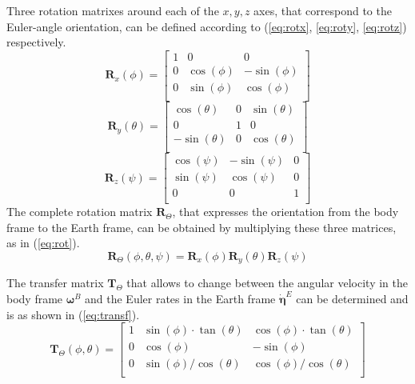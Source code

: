 \documentclass[journal, twoside]{IEEEtran}
\begin{document}
	Three rotation matrixes around each of the $x, y, z$ axes, that correspond to the Euler-angle orientation, can be defined according to (\ref{eq:rotx}, \ref{eq:roty}, \ref{eq:rotz}) respectively.
	\begin{equation} \label{eq:rotx}
	\bm{R}_x (\phi)=
	\left[ {\begin{array}{ccc}
		1 & 0 & 0 \\
		0 & \cos(\phi) & -\sin(\phi) \\
		0 &  \sin(\phi) & \cos(\phi) \\ 
		\end{array} } \right]
	\end{equation}  
	\begin{equation} \label{eq:roty}
	\bm{R}_y (\theta)=
	\left[ {\begin{array}{ccc}
		\cos(\theta) & 0 & \sin(\theta) \\
		0 & 1 & 0 \\
		-\sin(\theta) &  0 & \cos(\theta) \\ 
		\end{array} } \right]
	\end{equation}  
	\begin{equation} \label{eq:rotz}
	\bm{R}_z (\psi)=
	\left[ {\begin{array}{ccc}
		\cos(\psi) & -\sin(\psi) & 0 \\
		\sin(\psi) & \cos(\psi) & 0 \\
		0 &  0 & 1 \\ 
		\end{array} } \right]
	\end{equation}  
	The complete rotation matrix $\bm{R}_\Theta$, that expresses the orientation from the body frame to the Earth frame, can be obtained by multiplying these three matrices, as in (\ref{eq:rot}).
	\begin{equation} \label{eq:rot}
	\bm{R}_\Theta (\phi, \theta, \psi) = 	\bm{R}_x (\phi)  \bm{R}_y (\theta)  \bm{R}_z (\psi)
	\end{equation}  
	
	The transfer matrix $\bm{T}_\Theta$ that allows to change between the angular velocity in the body frame $\bm{\omega}^B$ and the Euler rates in the Earth frame $\bm{\dot \eta}^E$  can be determined and is as shown in (\ref{eq:transf}).
	\begin{equation} \label{eq:transf}
	\bm{T}_\Theta (\phi,\theta )= \left[ {\begin{array}{ccc}
		1 & \sin(\phi) \cdot \tan(\theta) & \cos(\phi) \cdot \tan (\theta) \\
		0 & \cos(\phi) & -\sin(\phi) \\
		0 &  \sin(\phi)/\cos(\theta) & \cos(\phi)/\cos(\theta)  \\ 
		\end{array} } \right]
	\end{equation}  
	
\end{document}
